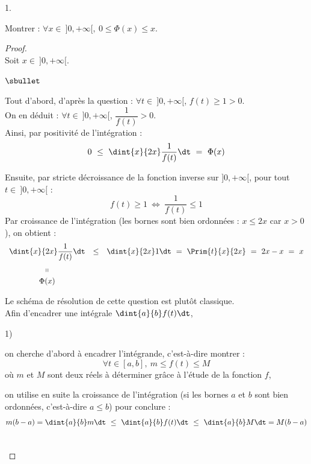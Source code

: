 \documentclass[11pt]{article}%
\begin{document}
\begin{noliste}{1.}
  
  \item Montrer : $\forall x \in \ ]0,+\infty[, \ 0 \leq \Phi(x) \leq 
  x$.
  
  \begin{proof}~\\
    Soit $x\in \ ]0,+\infty[$.
    \begin{noliste}{$\sbullet$}
      \item Tout d'abord, d'après la question  :
      $\forall t \in \ ]0,+\infty[$, $f(t) \geq 1 > 0$.\\[.1cm]
      On en déduit : $\forall t \in \ ]0,+\infty[$, $\dfrac{1}{f(t)}
      > 0$.\\[.1cm]
      Ainsi, par positivité de l'intégration :
      \[
        \begin{array}{ccc}
           0 \ \leq \ \dint{x}{2x} \dfrac{1}{f(t)} \dt \ = \
           \Phi(x)
        \end{array}
      \]
      
      \item Ensuite, par stricte décroissance de la fonction inverse
      sur $]0,+\infty[$, pour tout $t \in \ ]0,+\infty[$ :
      \[
        f(t) \geq 1 \ \Leftrightarrow \ \dfrac{1}{f(t)} \leq 1
      \]
      Par croissance de l'intégration (les bornes sont bien ordonnées 
      : $x \leq 2x$ car $x>0$), on obtient :
      \[
        \begin{array}{ccc}
          \dint{x}{2x} \dfrac{1}{f(t)} \dt & \leq & \dint{x}{2x} 1 \dt
          \ = \ \Prim{t}{x}{2x} \ = \ 2x-x \ = \ x
          \\[.4cm]
          \shortparallel
          \\[.1cm]
          \Phi(x)
        \end{array}
      \]
    \end{noliste}
    \conc{Finalement : $\forall x \in \ ]0,+\infty[$, $0 \leq 
    \Phi(x) \leq x$.}
    
    
    \newpage
    
    
    \begin{remark}
      Le schéma de résolution de cette question est plutôt classique.\\
      Afin d'encadrer une intégrale $\dint{a}{b} f(t) \dt$,
      \begin{noliste}{\scriptsize 1)}
        \item on cherche d'abord à encadrer l'intégrande, c'est-à-dire 
        montrer :
        \[
          \forall t \in [a,b], \ m \leq f(t) \leq M
        \]
        où $m$ et $M$ sont deux réels à déterminer grâce à l'étude de 
        la fonction $f$,
        \item on utilise en suite la croissance de l'intégration (si 
        les bornes $a$ et $b$ sont bien ordonnées, c'est-à-dire 
        $a \leq b$) pour conclure :
        \[
          m(b-a) = \dint{a}{b} m \dt \ \leq \ \dint{a}{b} f(t) \dt 
          \ \leq \ \dint{a}{b} M \dt = M(b-a)
        \]
      \end{noliste}
    \end{remark}~\\[-1.4cm]
  \end{proof}
  

\end{noliste}
\end{document}
